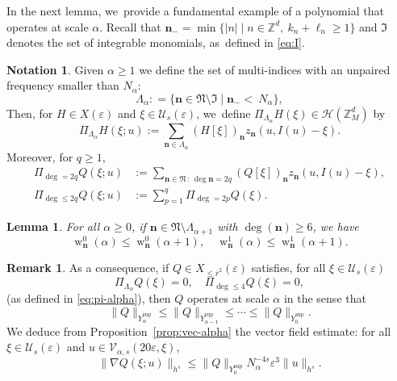 \documentclass[JEP,XML,SOM,Unicode,published]{cedram}
\theoremstyle{plain}
\newtheorem{lemma}[theorem]{Lemma}
\theoremstyle{definition}
\newtheorem{notation}[theorem]{Notation}
\newtheorem{remark}[theorem]{Remark}
\newcommand{\nb}{{\boldsymbol n}}
\newcommand{\Nb}{{\boldsymbol{\mathfrak{N}}}}
\newcommand{\Z}{\mathbb{Z}}
\newcommand{\1}{\mathbf{1}}
\newcommand{\Ysup}[1]{Y_{#1}^{\mathrm{sup}}}
\let\epsilon\varepsilon
\begin{document}
In the next lemma, we~provide a fundamental example of a polynomial that operates at scale $\alpha$. Recall that $\nb_{-}=\min\{|n|\mid n\in\Z^{d},\ k_{n}+\ell_{n}\geq1\}$ and $\mathfrak{I}$ denotes the set of integrable monomials, as~defined in \eqref{eq:I}.

\begin{notation}
Given $\alpha\geq1$ we define the set of multi-indices with an unpaired frequency smaller than $N_{\alpha}$:
\begin{equation}
\label{eq:scale}
\Lambda_\alpha : = \{\nb\in\Nb\setminus\mathfrak{I}\mid\nb_{-} <\ N_\alpha\},
\end{equation}
Then, for $H\in X(\epsilon)$ and $\xi\in\mathcal{U}_{s}(\epsilon)$, we~define $\Pi_{\Lambda_{\alpha}}H(\xi)\in\mathcal{H}(\Z_{M}^{d})$ by
\begin{equation}
\label{eq:pi-alpha}
\Pi_{\Lambda_{\alpha}}H(\xi;u)
:= \sum_{\nb\in\Lambda_{\alpha}}(H[\xi])_{\nb}z_{\nb}(u,I(u)-\xi).
\end{equation}
Moreover, for $q\geq1$,
\begin{align*}
\Pi_{\deg=2q}Q(\xi;u) &:= \sum_{\nb\in\Nb\,:\, \deg{\nb}=2q}(Q[\xi])_{\nb} z_{\nb}(u,I(u)-\xi),\\
\Pi_{\deg\leq2q}Q(\xi;u) &:= \sum_{p=1}^{q}\Pi_{\deg=2p}Q(\xi).
\end{align*}
\end{notation}

\begin{lemma}\label{lem:scale}
For all $\alpha\geq0$, if $\nb\in\Nb\setminus\Lambda_{\alpha+1}$ with $\deg(\nb)\geq6$, we have
\[
\operatorname{w}_{\nb}^{0}(\alpha) \leq \operatorname{w}_{\nb}^{0}(\alpha+1),\quad \operatorname{w}_{\nb}^{1}(\alpha) \leq \operatorname{w}_{\nb}^{1}(\alpha+1).
\]
\end{lemma}

\begin{remark}\label{rem:scale} As a consequence, if $Q\in X_{\leq\overline{r}^{2}}(\epsilon)$ satisfies, for all $\xi\in\mathcal{U}_{s}(\epsilon)$
\[
\Pi_{\Lambda_{\alpha}}Q(\xi) = 0,\quad \Pi_{\deg\leq4}Q(\xi)=0,
\]
(as defined in \eqref{eq:pi-alpha}), then $Q$ operates at scale $\alpha$ in the sense that
\[
\|Q\|_{\Ysup{\alpha}}\leq \|Q\|_{\Ysup{\alpha-1}} \leq \cdots \leq \|Q\|_{\Ysup{0}}.
\]
We deduce from Proposition~\ref{prop:vec-alpha} the vector field estimate: for all $\xi\in\mathcal{U}_{s}(\epsilon)$ and $u\in\mathcal{V}_{\alpha,s}(20\epsilon,\xi)$,
\[
\|\nabla Q(\xi;u)\|_{h^{s}} \leq \|Q\|_{\Ysup{0}}N_{\alpha}^{-4s}\epsilon^{3}\|u\|_{h^{s}}.
\]
\end{remark}
\end{document}
